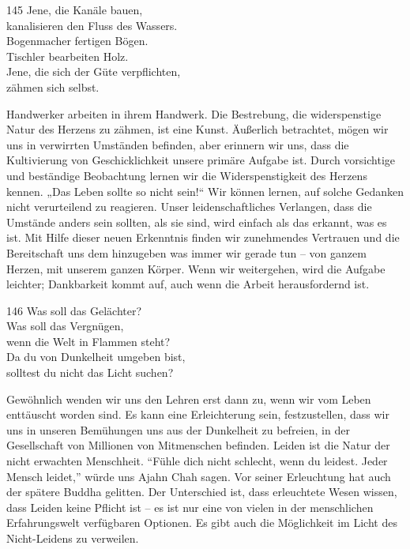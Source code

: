 
\begin{dhpVerse}{145}
\label{dhp-145}
Jene, die Kanäle bauen,\\ 
kanalisieren den Fluss des Wassers.\\ 
Bogenmacher fertigen Bögen.\\ 
Tischler bearbeiten Holz.\\ 
Jene, die sich der Güte verpflichten,\\ 
zähmen sich selbst. 
\end{dhpVerse}

\begin{dhpRefl}

Handwerker arbeiten in ihrem Handwerk. Die Bestrebung, die widerspenstige
Natur des Herzens zu zähmen, ist eine Kunst. Äußerlich betrachtet, mögen wir
uns in verwirrten Umständen befinden, aber erinnern wir uns, dass die
Kultivierung von Geschicklichkeit unsere primäre Aufgabe ist. Durch
vorsichtige und beständige Beobachtung lernen wir die Widerspenstigkeit des
Herzens kennen. „Das Leben sollte so nicht sein!“ Wir können lernen, auf
solche Gedanken nicht verurteilend zu reagieren. Unser
leidenschaftliches Verlangen, dass die Umstände anders sein sollten, als sie sind,
wird einfach als das erkannt, was es ist. Mit Hilfe dieser neuen Erkenntnis
finden wir zunehmendes Vertrauen und die Bereitschaft uns dem hinzugeben was
immer wir gerade tun -- von ganzem Herzen, mit unserem ganzen Körper. Wenn wir
weitergehen, wird die Aufgabe leichter; Dankbarkeit kommt auf, auch wenn die
Arbeit herausfordernd ist.

\end{dhpRefl}


\begin{dhpVerse}{146}
\label{dhp-146}
Was soll das Gelächter?\\ 
Was soll das Vergnügen,\\ 
wenn die Welt in Flammen steht?\\ 
Da du von Dunkelheit umgeben bist,\\ 
solltest du nicht das Licht suchen? 
\end{dhpVerse}

\begin{dhpRefl}

Gewöhnlich wenden wir uns den Lehren erst dann zu, wenn wir vom Leben
enttäuscht worden sind. Es kann eine Erleichterung sein, festzustellen, dass
wir uns in unseren Bemühungen uns aus der Dunkelheit zu befreien, in der
Gesellschaft von Millionen von Mitmenschen befinden. Leiden ist die Natur der
nicht erwachten Menschheit. “Fühle dich nicht schlecht, wenn du leidest. Jeder
Mensch leidet,” würde uns Ajahn Chah sagen. Vor seiner Erleuchtung hat auch
der spätere Buddha gelitten. Der Unterschied ist, dass erleuchtete Wesen
wissen, dass Leiden keine Pflicht ist -- es ist nur eine von vielen in der
menschlichen Erfahrungswelt verfügbaren Optionen. Es gibt auch die Möglichkeit
im Licht des Nicht-Leidens zu verweilen.

\end{dhpRefl}

